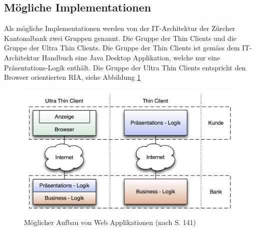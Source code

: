   \subsection{Mögliche Implementationen}
  
  Als mögliche Implementationen werden von der IT-Architektur der Zürcher
  Kantonalbank zwei Gruppen genannt. Die Gruppe der Thin Clients und die
  Gruppe der Ultra Thin Clients. Die Gruppe der Thin Clients ist gemäss dem
  IT-Architektur Handbuch eine Java Desktop Applikation, welche nur eine
  Präsentations-Logik enthält. Die Gruppe der Ultra Thin Clients entspricht den
  Browser orientierten \ac{RIA}, siehe Abbildung \ref{img:zkbWebAnwendungen}
  
  \begin{figure}[hbt]
    \begin{center}
      \includegraphics[width=\textwidth]{./image/zkbWebAnwendungen.png}
      \caption{Möglicher Aufbau von Web Applikationen (nach
      \cite{ZkbHandbuchDerItArchitektur} S. 141)}
      \label{img:zkbWebAnwendungen}
    \end{center}
  \end{figure}
  